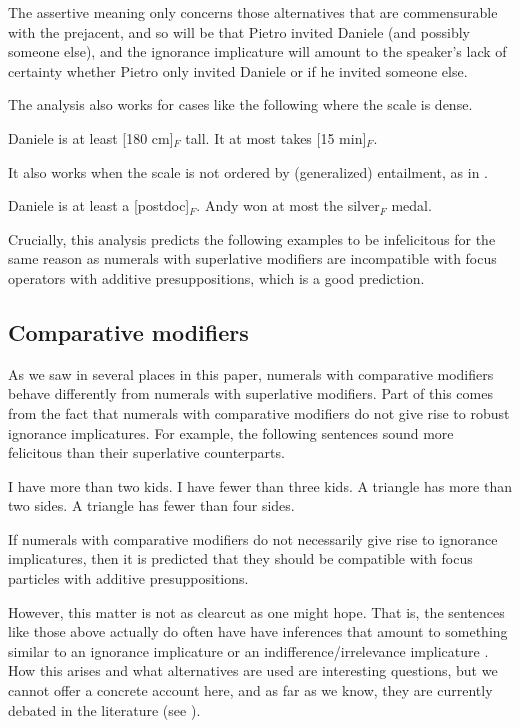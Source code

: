 \documentclass[output=paper]{langscibook}
\begin{document}
\noindent The assertive meaning only concerns those alternatives that are commensurable with the prejacent, and so will be that Pietro invited Daniele (and possibly someone else), and the ignorance implicature will amount to  the speaker's lack of certainty whether Pietro only invited Daniele or if he invited someone else.

The analysis also works for cases like the following where the scale is dense.

\ea
  \ea Daniele is at least [180 cm]$_F$ tall.
  \ex It at most takes [15 min]$_F$.
  \z
\z

\noindent It also works when the scale is not ordered by (generalized) entailment, as in .

\ea\label{don-sud:rank}
  \ea Daniele is at least a [postdoc]$_F$.
  \ex Andy won at most the silver$_F$ medal.
  \z
\z

\noindent Crucially, this analysis predicts the following examples to be infelicitous for the same reason as numerals with superlative modifiers are incompatible with focus operators with additive presuppositions, which is a good prediction.

\ea
  \z
\z

\subsection{Comparative modifiers}

As we saw in several places in this paper, numerals with comparative modifiers behave differently from numerals with superlative modifiers. Part of this comes from the fact that numerals with comparative modifiers do not give rise to robust ignorance implicatures. For example, the following sentences sound more felicitous than their superlative counterparts.

\ea
  \ea I have more than two kids.
  \ex I have fewer than three kids.
  \z
\ex
  \ea A triangle has more than two sides.
  \ex A triangle has fewer than four sides.
  \z
\z

\noindent If numerals with comparative modifiers do not necessarily give rise to ignorance implicatures, then it is predicted that they should be compatible with focus particles with additive presuppositions.

However, this matter is not as clearcut as one might hope. That is, the sentences like those above actually do often have have inferences that amount to something similar to an ignorance implicature or an indifference/irrelevance implicature \citep{meyer, lauer}. How this arises and what alternatives are used are interesting questions, but we cannot offer a concrete account here, and as far as we know, they are currently debated in the literature (see \citealt{foxhackl, mayr, schwarz}).
\end{document}
